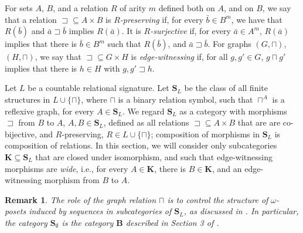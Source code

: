 \documentclass[12pt]{amsart}
\theoremstyle{plain}
\newtheorem{remark}[theorem]{\bf Remark}
\newcommand \sqsp{\sqsupset}
\newcommand \BBf{\mathbf{B}}
\newcommand \KKf{\mathbf{K}}
\newcommand \SSf{\mathbf{S}}
\begin{document}
For sets $A$, $B$, and a relation $R$ of arity $m$ defined both on $A$, and on $B$, we say that a relation $\sqsp \subseteq A \times B$  is \emph{$R$-preserving} if, for every $\bar{b} \in B^m$, we have that $R(\bar{b})$ and $\bar{a} \sqsp \bar{b}$ implies $R(\bar{a})$. It is \emph{$R$-surjective} if, for every $\bar{a} \in A^m$, $R(\bar{a})$ implies that there is $\bar{b} \in B^m$ such that $R(\bar{b})$, and $\bar{a} \sqsp \bar{b}$.  For graphs $(G,\sqcap)$, $(H,\sqcap)$, we say that $\sqsp \subseteq G \times H$ is \emph{edge-witnessing} if, for all $g, g' \in G$, $g \sqcap g'$ implies that there is $h \in H$ with $g,g' \sqsp h$. 

Let $L$ be a countable relational signature. Let $\SSf_L$ be the class of all finite structures in $L \cup \{\sqcap\}$, where $\sqcap$ is a binary relation symbol, such that $\sqcap^A$ is a reflexive graph, for every $A \in \SSf_L$.  We regard $\SSf_L$ as a category with morphisms $\sqsp$ from $B$ to $A$, $A,B \in \SSf_L$, defined as all relations  $\sqsp \subseteq A \times B$ that are are co-bijective, and  $R$-preserving, $R \in L \cup \{\sqcap\}$; composition of morphisms in $\SSf_L$ is composition of relations. In this section, we will consider only subcategories $\KKf \subseteq \SSf_L$ that are closed under isomorphism, and such that edge-witnessing morphisms are \emph{wide}, i.e., for every $A \in \KKf$, there is $B \in \KKf$, and an edge-witnessing morphism from $B$ to $A$.

\begin{remark}
The role of the graph relation $\sqcap$ is to control the structure of $\omega$-posets induced by sequences in subcategories of $\SSf_L$, as  discussed in \cite{BaBiVi2}. In particular, the category $\SSf_\emptyset$ is the category $\BBf$ described in Section 3 of \cite{BaBiVi2}.   

\end{remark}

\end{document}
